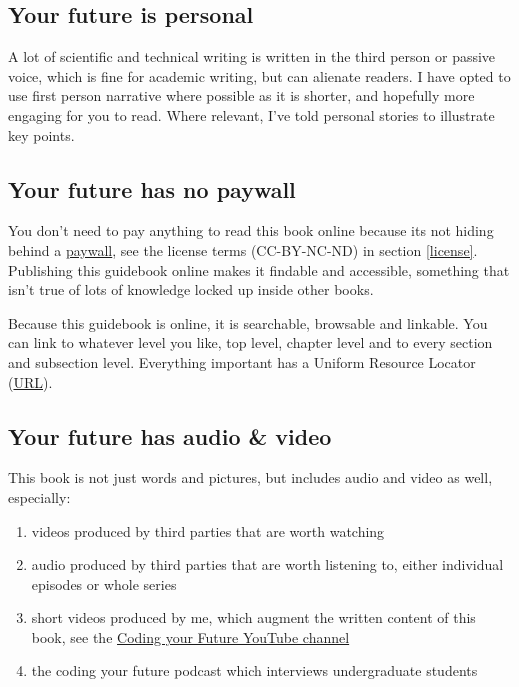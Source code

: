 \documentclass[
]{book}
\providecommand{\tightlist}{%
  \setlength{\itemsep}{0pt}\setlength{\parskip}{0pt}}
\begin{document}
\hypertarget{firstperson}{%
\subsection{Your future is personal}\label{firstperson}}

A lot of scientific and technical writing is written in the third person or passive voice, which is fine for academic writing, but can alienate readers. I have opted to use first person narrative where possible as it is shorter, and hopefully more engaging for you to read. \citep{googler} Where relevant, I've told personal stories to illustrate key points.

\hypertarget{openaccess}{%
\subsection{Your future has no paywall}\label{openaccess}}

You don't need to pay anything to read this book online because its not hiding behind a \href{https://en.wikipedia.org/wiki/Paywall}{paywall}, see the license terms (CC-BY-NC-ND) in section \ref{license}. Publishing this guidebook online makes it findable and accessible, something that isn't true of lots of knowledge locked up inside other books.

Because this guidebook is online, it is searchable, browsable and linkable. You can link to whatever level you like, top level, chapter level and to every section and subsection level. Everything important has a Uniform Resource Locator (\href{https://en.wikipedia.org/wiki/URL}{URL}).

\hypertarget{av}{%
\subsection{Your future has audio \& video}\label{av}}

This book is not just words and pictures, but includes audio and video as well, especially:

\begin{enumerate}
\def\labelenumi{\arabic{enumi}.}
\tightlist
\item
  videos produced by third parties that are worth watching
\item
  audio produced by third parties that are worth listening to, either individual episodes or whole series
\item
  short videos produced by me, which augment the written content of this book, see the \href{https://www.youtube.com/channel/UCLBv_u8JmyUPqmRALIjVnLg}{Coding your Future YouTube channel}
\item
  the coding your future podcast which interviews undergraduate students
\end{enumerate}
\end{document}
